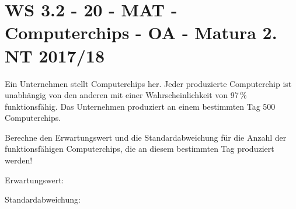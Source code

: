 \section{WS 3.2 - 20 - MAT - Computerchips - OA - Matura 2. NT 2017/18}

\begin{beispiel}[WS 3.2]{1}
Ein Unternehmen stellt Computerchips her. Jeder produzierte Computerchip ist unabhängig von
den anderen mit einer Wahrscheinlichkeit von 97\,\% funktionsfähig. Das Unternehmen produziert an einem bestimmten Tag 500 Computerchips.

Berechne den Erwartungswert und die Standardabweichung für die Anzahl der funktionsfähigen Computerchips, die an diesem bestimmten Tag produziert werden!\leer

Erwartungswert:  \leer

Standardabweichung: 

\end{beispiel}